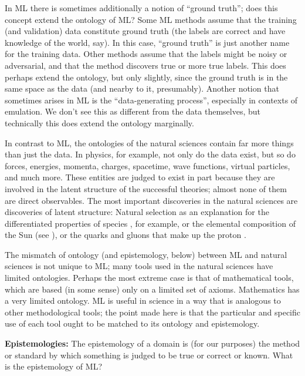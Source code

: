 \documentclass{article}
\renewcommand{\paragraph}[1]{\noindent\par\textbf{#1}}
\begin{document}
In ML there is sometimes additionally a notion of ``ground truth''; does this concept extend the ontology of ML?
Some ML methods assume that the training (and validation) data constitute ground truth (the labels are correct and have knowledge of the world, say).
In this case, ``ground truth'' is just another name for the training data.
Other methods assume that the labels might be noisy or adversarial, and that the method discovers true or more true labels.
This does perhaps extend the ontology, but only slightly, since the ground truth is in the same space as the data (and nearby to it, presumably).
Another notion that sometimes arises in ML is the ``data-generating process'', especially in contexts of emulation.
We don't see this as different from the data themselves, but technically this does extend the ontology marginally.

In contrast to ML, the ontologies of the natural sciences contain far more things than just the data.
In physics, for example, 
not only do the data exist, but so do forces, energies, momenta, charges, spacetime, wave functions, virtual particles, and much more.
These entities are judged to exist in part because they are involved in the latent structure of the successful theories; almost none of them are direct observables.
The most important discoveries in the natural sciences are discoveries of latent structure: Natural selection as an explanation for the differentiated properties of species \cite{natural_selection}, for example, or the elemental composition of the Sun (see \citealt{sun_composition}), or the quarks and gluons that make up the proton \cite{proton_substructure}.

The mismatch of ontology (and epistemology, below) between ML and natural sciences is not unique to ML;
many tools used in the natural sciences have limited ontologies.
Perhaps the most extreme case is that of mathematical tools, which are based (in some sense) only on a limited set of axioms.
Mathematics has a very limited ontology.
ML is useful in science in a way that is analogous to other methodological tools; the point made here is that the particular and specific use of each tool ought to be matched to its ontology and epistemology.

\paragraph{Epistemologies:}
The epistemology of a domain is (for our purposes) the method or standard by which something is judged to be true or correct or known.
What is the epistemology of ML?
\end{document}
